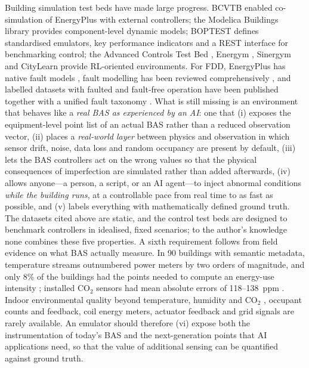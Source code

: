 \documentclass[preprint,12pt,authoryear=false]{elsarticle}
\begin{document}
Building simulation test beds have made large progress. BCVTB \cite{wetter2011bcvtb} enabled co-simulation of
EnergyPlus \cite{crawley2001energyplus} with external controllers; the Modelica Buildings library
\cite{wetter2014modelica} provides component-level dynamic models; BOPTEST \cite{blum2021boptest} defines
standardised emulators, key performance indicators and a REST interface for benchmarking control; the Advanced
Controls Test Bed \cite{marzullo2022actb}, Energym \cite{scharnhorst2021energym}, Sinergym \cite{jimenez2021sinergym}
and CityLearn \cite{vazquez2019citylearn} provide RL-oriented environments. For FDD, EnergyPlus has native fault models
\cite{zhang2017faults}, fault modelling has been reviewed comprehensively \cite{li2018faultreview}, and labelled
datasets with faulted and fault-free operation have been published \cite{wen2012rp1312,granderson2023dataset} together
with a unified fault taxonomy \cite{chen2021taxonomy}. What is still missing is an environment that behaves like a
\emph{real BAS as experienced by an AI}: one that (i) exposes the equipment-level point list of an actual BAS rather
than a reduced observation vector, (ii) places a \emph{real-world layer} between physics and observation in which
sensor drift, noise, data loss and random occupancy are present by default, (iii) lets the BAS controllers act on the
wrong values so that the physical consequences of imperfection are simulated rather than added afterwards, (iv)
allows anyone---a person, a script, or an AI agent---to inject abnormal conditions \emph{while the building runs}, at
a controllable pace from real time to as fast as possible, and (v) labels everything with mathematically defined
ground truth. The datasets cited above are static, and the control test beds are designed to benchmark controllers in
idealised, fixed scenarios; to the author's knowledge none combines these five properties. A sixth requirement follows
from field evidence on what BAS actually measure. In 90 buildings with semantic metadata, temperature streams
outnumbered power meters by two orders of magnitude, and only 8\% of the buildings had the points needed to compute an
energy-use intensity \cite{fierro2019mortar}; installed CO$_2$ sensors had mean absolute errors of 118--138~ppm
\cite{fisk2010co2}. Indoor environmental quality beyond temperature, humidity and CO$_2$ \cite{wellv2}, occupant
counts and feedback, coil energy meters, actuator feedback and grid signals are rarely available. An emulator should
therefore (vi) expose both the instrumentation of today's BAS and the next-generation points that AI applications
need, so that the value of additional sensing can be quantified against ground truth.
\end{document}
